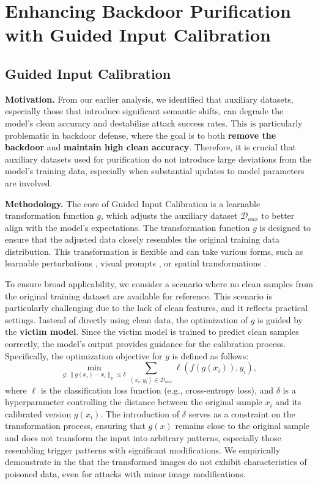 \section{Enhancing Backdoor Purification with Guided Input Calibration}
\subsection{Guided Input Calibration}
\textbf{Motivation.} From our earlier analysis, we identified that auxiliary datasets, especially those that introduce significant semantic shifts, can degrade the model’s clean accuracy and destabilize attack success rates. This is particularly problematic in backdoor defense, where the goal is to both \textbf{remove the backdoor} and \textbf{maintain high clean accuracy}. Therefore, it is crucial that auxiliary datasets used for purification do not introduce large deviations from the model's training data, especially when substantial updates to model parameters are involved. 


\textbf{Methodology.} The core of Guided Input Calibration is a learnable transformation function $g$, which adjusts the auxiliary dataset $\mathcal{D}_{aux}$ to better align with the model's expectations. The transformation function $g$ is designed to ensure that the adjusted data closely resembles the original training data distribution. This transformation is flexible and can take various forms, such as learnable perturbations \cite{song2023deep}, visual prompts \cite{bahng2022exploring}, or spatial transformations \cite{xiao2018spatially}.

To ensure broad applicability, we consider a scenario where no clean samples from the original training dataset are available for reference. This scenario is particularly challenging due to the lack of clean features, and it reflects practical settings. Instead of directly using clean data, the optimization of $g$ is guided by the \textbf{victim model}. Since the victim model is trained to predict clean samples correctly, the model’s output provides guidance for the calibration process. Specifically, the optimization objective for $g$ is defined as follows:
\begin{equation}
\min_{g:\|g(x_i)-x_i\|_p\leq \delta}  \sum_{(x_i,y_i)\in\mathcal{D}_{aux}} \ell(f(g(x_i)), y_i),
\end{equation}
where $\ell$ is the classification loss function (e.g., cross-entropy loss), and $\delta$ is a hyperparameter controlling the distance between the original sample $x_i$ and its calibrated version $g(x_i)$. The introduction of $\delta$ serves as a constraint on the transformation process, ensuring that $g(x)$ remains close to the original sample and does not transform the input into arbitrary patterns, especially those resembling trigger patterns with significant modifications. We empirically demonstrate in the \app that the transformed images do not exhibit characteristics of poisoned data, even for attacks with minor image modifications.

